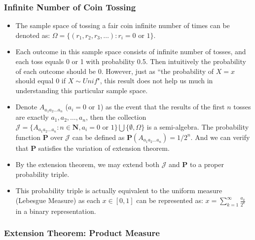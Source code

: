 \documentclass[handout]{beamer}
\newcommand{\BP}{\mathbf{P}}
\begin{document}
\frame
{
  \frametitle{Infinite Number of Coin Tossing}

   \begin{itemize}
        
            \item<1-> The sample space of tossing a fair coin infinite number of times can be denoted as: $\Omega=\{(r_1, r_2, r_3,\ldots): r_i=0 \text{ or } 1\}$.            
                   
    \item<2-> Each outcome in this sample space consists of infinite number of tosses, and each toss equals 0 or 1 with probability 0.5. Then intuitively the probability of each outcome should be 0. However, just as ``the probability of $X=x$ should equal 0 if $X\sim Unif$", this result does not help us much in understanding this particular sample space. 
        
 \item<3->  Denote $A_{a_1a_2\ldots a_n}$ ($a_i= 0 \text{ or } 1 $) as the event that the results of the first $n$ tosses are exactly $a_1,a_2, \ldots, a_n$, then the collection $\mathcal{J}=\{A_{a_1a_2\ldots a_n}: n\in \mathbf{N}, a_i= 0 \text{ or } 1 \} \bigcup \{\emptyset, \Omega\}$ is a semi-algebra. The probability function $\BP$ over $\mathcal{J}$ can be defined as $\BP(A_{a_1a_2\ldots a_n})=1/2^n$. And we can verify that $\BP$ satisfies the variation of extension theorem.
          \item<5-> By the extension theorem, we may extend both $\mathcal{J}$  and  $\BP$ to a proper probability triple. 
                       \item<6-> This probability triple is actually equivalent to the uniform measure (Lebesgue Measure) as each $x\in [0,1]$ can be represented as: $x=\sum_{k=1}^{\infty} \frac{a_k}{2^k}$ in a binary representation.  

                   \end{itemize}

}


\subsubsection{Extension Theorem: Product Measure}
\end{document}
